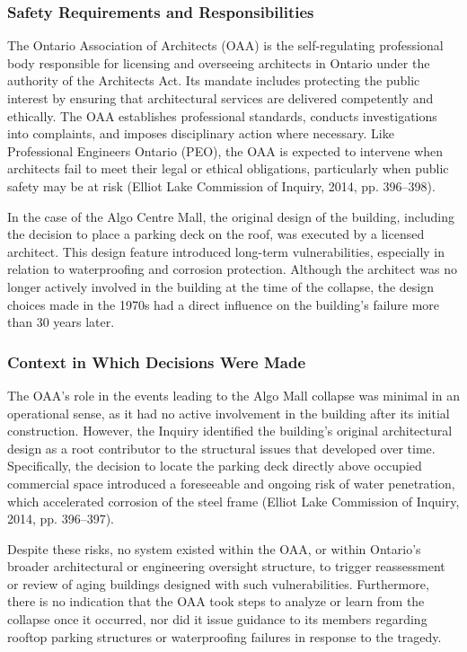\documentclass[12pt]{article}
\begin{document}
\subsubsection*{Safety Requirements and Responsibilities}
The Ontario Association of Architects (OAA) is the self-regulating professional body responsible for licensing and overseeing architects in Ontario under the authority of the Architects Act. Its mandate includes protecting the public interest by ensuring that architectural services are delivered competently and ethically. The OAA establishes professional standards, conducts investigations into complaints, and imposes disciplinary action where necessary. Like Professional Engineers Ontario (PEO), the OAA is expected to intervene when architects fail to meet their legal or ethical obligations, particularly when public safety may be at risk (Elliot Lake Commission of Inquiry, 2014, pp. 396–398).

In the case of the Algo Centre Mall, the original design of the building, including the decision to place a parking deck on the roof, was executed by a licensed architect. This design feature introduced long-term vulnerabilities, especially in relation to waterproofing and corrosion protection. Although the architect was no longer actively involved in the building at the time of the collapse, the design choices made in the 1970s had a direct influence on the building’s failure more than 30 years later.

\subsubsection*{Context in Which Decisions Were Made}
The OAA’s role in the events leading to the Algo Mall collapse was minimal in an operational sense, as it had no active involvement in the building after its initial construction. However, the Inquiry identified the building’s original architectural design as a root contributor to the structural issues that developed over time. Specifically, the decision to locate the parking deck directly above occupied commercial space introduced a foreseeable and ongoing risk of water penetration, which accelerated corrosion of the steel frame (Elliot Lake Commission of Inquiry, 2014, pp. 396–397).

Despite these risks, no system existed within the OAA, or within Ontario’s broader architectural or engineering oversight structure, to trigger reassessment or review of aging buildings designed with such vulnerabilities. Furthermore, there is no indication that the OAA took steps to analyze or learn from the collapse once it occurred, nor did it issue guidance to its members regarding rooftop parking structures or waterproofing failures in response to the tragedy.
\end{document}
